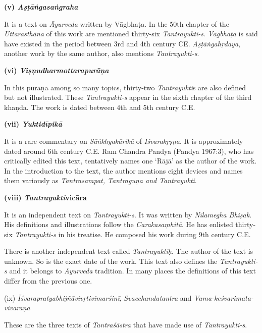 \vskip 2pt

\textbf{(v) \textit{Aṣṭāṅgasaṅgraha}}

It is a text on \textit{Āyurveda} written by Vāgbhaṭa. In the 50th chapter of the \textit{Uttarasthāna} of this work are mentioned thirty-six \textit{Tantrayukti-s}. \textit{Vāgbhaṭa} is said have existed in the period between 3rd and 4th century CE. \textit{Aṣṭāṅgahṛdaya}, another work by the same author, also mentions \textit{Tantrayukti-s}.

\vskip 2pt

\textbf{(vi) \textit{Viṣṇudharmottarapurāṇa}}

In this purāṇa among so many topics, thirty-two \textit{Tantrayukti}s are also defined but not illustrated. These \textit{Tantrayukti-s} appear in the sixth chapter of the third khaṇda. The work is dated between 4th and 5th century C.E.

\vskip 2pt

\textbf{(vii) \textit{Yuktidīpikā}}

It is a rare commentary on \textit{Sāṅkhyakārikā} of \textit{Īśvarakṛṣṇa}. It is approximately dated around 6th century C.E. Ram Chandra Pandya (Pandya 1967:3), who has critically edited this text, tentatively names one ‘Rājā’ as the author of the work. In the introduction to the text, the author mentions eight devices and names them variously as \textit{Tantrasampat, Tantraguṇa and Tantrayukti}.

\vskip 2pt

\textbf{(viii) \textit{Tantrayukti}vicāra}

It is an independent text on \textit{Tantrayukti-s}. It was written by \textit{Nīlamegha Bhiṣak}. His definitions and illustrations follow the \textit{Carakasaṃhitā}. He has enlisted thirty-six \textit{Tantrayukti-s} in his treatise. He composed his work during 9th century C.E.

There is another independent text called \textit{Tantrayuktiḥ}. The author of the text is unknown. So is the exact date of the work. This text also defines the \textit{Tantrayukti-s} and it belongs to \textit{Āyurveda} tradition. In many places the definitions of this text differ from the previous one. 

\vskip 2pt

(ix) \textit{Īśvarapratyabhijñāvivṛtivimarśinī}, \textit{Svacchandatantra} and \textit{Vama-keśva\-rimata-vivaraṇa}

These are the three texts of \textit{Tantraśāstra} that have made use of \textit{Tantrayukti-s}.

